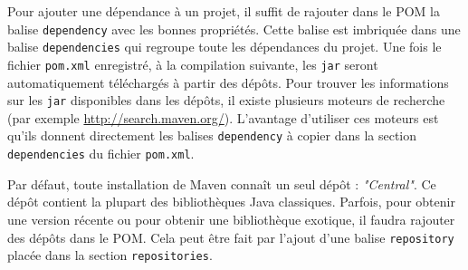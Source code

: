 \documentclass[a4paper,11pt]{article}
\begin{document}
Pour ajouter une dépendance à un projet, il suffit de rajouter dans le POM la balise \texttt{dependency} avec les 
bonnes propriétés. Cette balise est imbriquée dans une balise \texttt{dependencies} qui regroupe toute les dépendances du projet.
Une fois le fichier \texttt{pom.xml} enregistré, à la compilation suivante, les \texttt{jar} seront automatiquement téléchargés 
à partir des dépôts. Pour trouver les informations sur les \texttt{jar} disponibles dans les dépôts, il existe plusieurs moteurs de recherche 
(par exemple \url{http://search.maven.org/}). L'avantage d'utiliser ces moteurs est qu'ils donnent directement les 
balises \texttt{dependency} à copier dans la section \texttt{dependencies} du fichier \texttt{pom.xml}.

Par défaut, toute installation de Maven connaît un seul dépôt : \emph{"Central"}. Ce dépôt contient la plupart des bibliothèques 
Java classiques. Parfois, pour obtenir une version récente ou pour obtenir une bibliothèque exotique, il faudra rajouter 
des dépôts dans le POM. Cela peut être fait par l'ajout d'une balise \texttt{repository} placée dans la section \texttt{repositories}.
\end{document}
